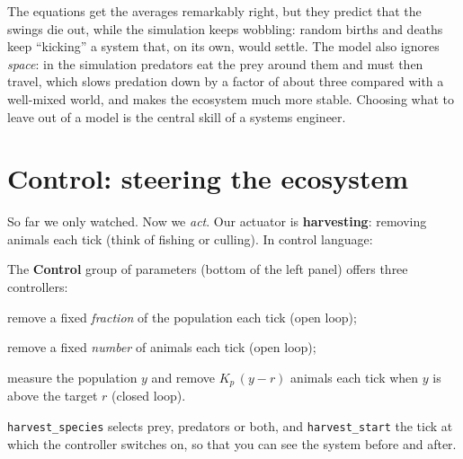 \documentclass[11pt,a4paper]{article}
\newcommand{\param}[1]{\texttt{\small #1}}
\begin{document}
\begin{idea}
The equations get the averages remarkably right, but they predict that the swings die out, while the
simulation keeps wobbling: random births and deaths keep ``kicking'' a system that, on its own, would settle.
The model also ignores \emph{space}: in the simulation predators eat the prey around them and must then
travel, which slows predation down by a factor of about three compared with a well-mixed world, and makes
the ecosystem much more stable. Choosing what to leave out of a model is the central skill of a
systems engineer.
\end{idea}

\section{Control: steering the ecosystem}\label{sec:control}
So far we only watched. Now we \emph{act}. Our actuator is \textbf{harvesting}: removing animals each tick
(think of fishing or culling). In control language:

\begin{center}
\end{center}

The \textbf{Control} group of parameters (bottom of the left panel) offers three controllers:

\begin{description}[nosep]
  \item[constant effort] remove a fixed \emph{fraction} of the population each tick (open loop);
  \item[constant quota] remove a fixed \emph{number} of animals each tick (open loop);
  \item[feedback (P-control)] measure the population $y$ and remove $K_p\,(y - r)$ animals each tick when
        $y$ is above the target $r$ (closed loop).
\end{description}
\param{harvest\_species} selects prey, predators or both, and \param{harvest\_start} the tick at which the
controller switches on, so that you can see the system before and after.
\end{document}
